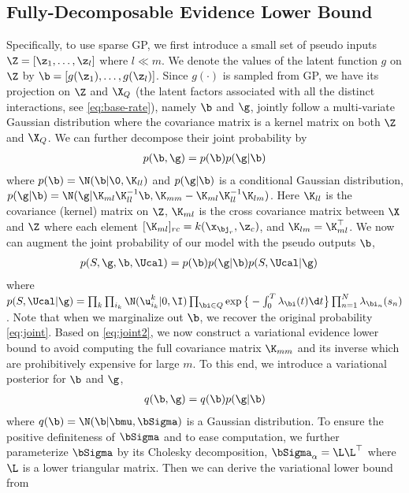 \subsection{Fully-Decomposable  Evidence Lower Bound}
Specifically, to use sparse GP, we first introduce a small set of pseudo inputs $\Z = [\z_1, \ldots, \z_l]$ where $l \ll m$. We denote the values of the latent function $g$ on $\Z$ by $\b = [g(\z_1), \ldots, g(\z_l)]$. Since $g(\cdot)$ is sampled from GP, we have its projection on $\Z$ and $\X_Q$ (the latent factors associated with all the distinct interactions, see \eqref{eq:base-rate}), namely $\b$ and $\g$, jointly  follow a multi-variate Gaussian distribution where the covariance matrix is a kernel matrix on both $\Z$ and $\X_Q$. We can further decompose their joint probability by 
\begin{align}
p(\b, \g) = p(\b) p(\g|\b) \label{eq:gp2}
\end{align}
where $p(\b) = \N(\b|\0, \K_{ll})$ and $p(\g|\b)$ is a conditional Gaussian distribution, $p(\g|\b) = \N(\g| \K_{ml}\K_{ll}^{-1}\b, \K_{mm} -\K_{ml}\K_{ll}^{-1}\K_{lm})$. Here $\K_{ll}$ is the covariance (kernel) matrix on $\Z$,  $\K_{ml}$ is the cross covariance matrix between $\X$ and $\Z$ where each element $[\K_{ml}]_{rc} = k(\x_{\bj_r}, \z_c)$, and $\K_{lm} = \K^\top_{ml}$. We now can augment the joint probability of our model with the pseudo outputs $\b$, 
\begin{align}
&p(S, \g, \b, \Ucal) =   p(\b) p(\g|\b) p(S, \Ucal|\g)  \label{eq:joint2}
\end{align}
where $p(S, \Ucal|\g) = \prod_{k}\prod_{i_k} \N(\u^k_{i_k}|0, \I)\prod_{\bi \in Q}\exp\big\{-\int_0^T \lambda_\bi(t)\d t\big\} \prod_{n=1}^N \lambda_{\bi_n}(s_n)$. 
Note that when we marginalize out $\b$, we recover the original probability \eqref{eq:joint}. Based on \eqref{eq:joint2}, we now construct a variational evidence lower bound to avoid computing the full covariance matrix $\K_{mm}$ and its inverse which are prohibitively expensive for large $m$.  To this end, we introduce a variational posterior for $\b$ and $\g$, 
\begin{align}
q(\b, \g) = q(\b)p(\g|\b) \label{eq:posterior}
\end{align}
where $q(\b) = \N(\b|\bmu, \bSigma)$ is a Gaussian distribution. To ensure the positive definiteness of $\bSigma$ and to ease computation, we further parameterize $\bSigma$ by its Cholesky decomposition, $\bSigma_\alpha = \L\L^\top$ where $\L$ is a lower triangular matrix. Then we can derive the variational lower bound from
